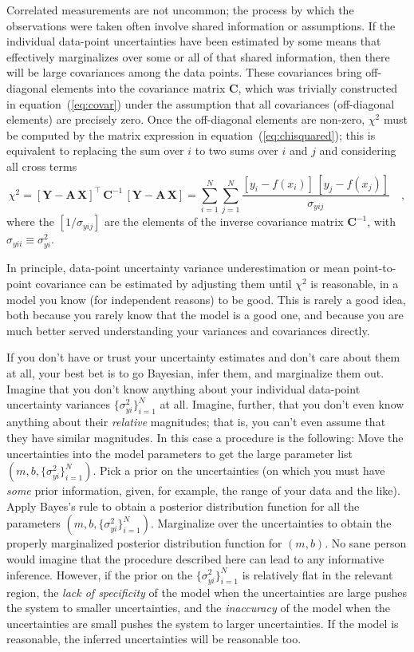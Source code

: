 \documentclass[12pt,twoside]{article}
\newcommand{\equationname}{equation}
\newcommand{\mmatrix}[1]{\boldsymbol{#1}}
\newcommand{\inverse}[1]{{#1}^{-1}}
\newcommand{\transpose}[1]{{#1}^{\scriptscriptstyle \top}}
\newcommand{\mA}{\mmatrix{A}}
\newcommand{\mC}{\mmatrix{C}}
\newcommand{\mCinv}{\inverse{\mC}}
\newcommand{\mX}{\mmatrix{X}}
\newcommand{\mY}{\mmatrix{Y}}
\newcommand{\setofall}[3]{\{{#1}\}_{{#2}}^{{#3}}}
\newcommand{\allsigmay}{\setofall{\sigma_{yi}^2}{i=1}{N}}
\begin{document}
Correlated measurements are not uncommon; the process by which the
observations were taken often involve shared information or
assumptions. If the individual data-point uncertainties have been
estimated by some means that effectively marginalizes over some or all
of that shared information, then there will be large covariances among
the data points.  These covariances bring off-diagonal elements into
the covariance matrix $\mC$, which was trivially constructed in
\equationname~(\ref{eq:covar}) under the assumption that all
covariances (off-diagonal elements) are precisely zero.  Once the
off-diagonal elements are non-zero, $\chi^2$ must be computed by the
matrix expression in \equationname~(\ref{eq:chisquared}); this is
equivalent to replacing the sum over $i$ to two sums over $i$ and $j$
and considering all cross terms
\begin{equation}
\chi^2 =
 \transpose{\left[\mY-\mA\,\mX\right]}\,\mCinv\,\left[\mY-\mA\,\mX\right]
 = \sum_{i=1}^N \sum_{j=1}^N
 \frac{\left[y_i-f(x_i)\right]\,[y_j-f(x_j)]}
 {\sigma_{yij}} \quad,
\end{equation} 
where the $[1/\sigma_{yij}]$ are the elements of the inverse covariance
matrix $\inverse{\mC}$, with $\sigma_{yii}\equiv\sigma_{yi}^2$.

In principle, data-point uncertainty variance underestimation or mean
point-to-point covariance can be estimated by adjusting them until
$\chi^2$ is reasonable, in a model you know (for independent reasons)
to be good.  This is rarely a good idea, both because you rarely know
that the model is a good one, and because you are much better served
understanding your variances and covariances directly.

If you don't have or trust your uncertainty estimates and don't care
about them at all, your best bet is to go Bayesian, infer them, and
marginalize them out.  Imagine that you don't know anything about your
individual data-point uncertainty variances $\allsigmay$ at all.
Imagine, further, that you don't even know anything about their
\emph{relative} magnitudes; that is, you can't even assume that they
have similar magnitudes.  In this case a procedure is the following:
Move the uncertainties into the model parameters to get the large
parameter list $(m,b,\allsigmay)$.  Pick a prior on the uncertainties
(on which you must have \emph{some} prior information, given, for
example, the range of your data and the like).  Apply Bayes's rule to
obtain a posterior distribution function for all the parameters
$(m,b,\allsigmay)$.  Marginalize over the uncertainties to obtain the
properly marginalized posterior distribution function for $(m,b)$.  No
sane person would imagine that the procedure described here can lead
to any informative inference.  However, if the prior on the
$\allsigmay$ is relatively flat in the relevant region, the \emph{lack
  of specificity} of the model when the uncertainties are large pushes
the system to smaller uncertainties, and the \emph{inaccuracy} of the
model when the uncertainties are small pushes the system to larger
uncertainties.  If the model is reasonable, the inferred uncertainties
will be reasonable too.
\end{document}

